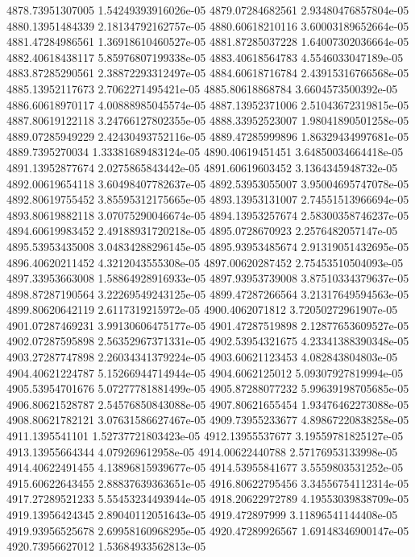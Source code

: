 {4878.73951307005 1.54249393916026e-05
4879.07284682561 2.93480476857804e-05
4880.13951484339 2.18134792162757e-05
4880.60618210116 3.60003189652664e-05
4881.47284986561 1.36918610460527e-05
4881.87285037228 1.64007302036664e-05
4882.40618438117 5.85976807199338e-05
4883.40618564783 4.5546033047189e-05
4883.87285290561 2.38872293312497e-05
4884.60618716784 2.43915316766568e-05
4885.13952117673 2.7062271495421e-05
4885.80618868784 3.6604573500392e-05
4886.60618970117 4.00888985045574e-05
4887.13952371006 2.51043672319815e-05
4887.80619122118 3.24766127802355e-05
4888.33952523007 1.98041890501258e-05
4889.07285949229 2.42430493752116e-05
4889.47285999896 1.86329434997681e-05
4889.7395270034 1.33381689483124e-05
4890.40619451451 3.64850034664418e-05
4891.13952877674 2.0275865843442e-05
4891.60619603452 3.1364345948732e-05
4892.00619654118 3.60498407782637e-05
4892.53953055007 3.95004695747078e-05
4892.80619755452 3.85595312175665e-05
4893.13953131007 2.74551513966694e-05
4893.80619882118 3.07075290046674e-05
4894.13953257674 2.58300358746237e-05
4894.60619983452 2.49188931720218e-05
4895.0728670923 2.2576482057147e-05
4895.53953435008 3.04834288296145e-05
4895.93953485674 2.91319051432695e-05
4896.40620211452 4.3212043555308e-05
4897.00620287452 2.75453510504093e-05
4897.33953663008 1.58864928916933e-05
4897.93953739008 3.87510334379637e-05
4898.87287190564 3.22269549243125e-05
4899.47287266564 3.21317649594563e-05
4899.80620642119 2.6117319215972e-05
4900.4062071812 3.72050272961907e-05
4901.07287469231 3.99130606475177e-05
4901.47287519898 2.12877653609527e-05
4902.07287595898 2.56352967371331e-05
4902.53954321675 4.23341388390348e-05
4903.27287747898 2.26034341379224e-05
4903.60621123453 4.082843804803e-05
4904.40621224787 5.15266944714944e-05
4904.6062125012 5.09307927819994e-05
4905.53954701676 5.07277781881499e-05
4905.87288077232 5.99639198705685e-05
4906.80621528787 2.54576850843088e-05
4907.80621655454 1.93476462273088e-05
4908.80621782121 3.07631586627467e-05
4909.73955233677 4.89867220838258e-05
4911.1395541101 1.52737721803423e-05
4912.13955537677 3.19559781825127e-05
4913.13955664344 4.079269612958e-05
4914.00622440788 2.57176953133998e-05
4914.40622491455 4.13896815939677e-05
4914.53955841677 3.5559803531252e-05
4915.60622643455 2.88837639363651e-05
4916.80622795456 3.34556754112314e-05
4917.27289521233 5.55453234493944e-05
4918.20622972789 4.19553039838709e-05
4919.13956424345 2.89040112051643e-05
4919.472897999 3.11896541144408e-05
4919.93956525678 2.69958160968295e-05
4920.47289926567 1.69148346900147e-05
4920.73956627012 1.53684933562813e-05
}
